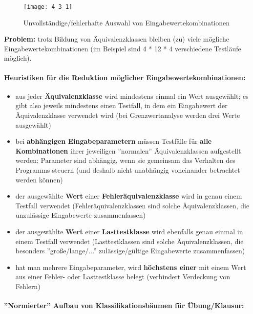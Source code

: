 \begin{figure}[h]
	\centering
	\caption{Unvollständige/fehlerhafte Auswahl von Eingabewertekombinationen}
	\texttt{[image: 4\_3\_1]}
\end{figure}

\textbf{Problem:} trotz Bildung von Äquivalenzklassen bleiben (zu) viele mögliche Eingabewertekombinationen (im Beispiel sind 4 * 12 * 4 verschiedene Testläufe möglich).

\paragraph{Heuristiken für die Reduktion möglicher Eingabewertekombinationen:}

\begin{itemize}
	\item aus jeder \textbf{Äquivalenzklasse} wird mindestens einmal ein Wert ausgewählt; es gibt also jeweils mindestens einen Testfall, in dem ein Eingabewert der Äquivalenzklasse verwendet wird (bei Grenzwertanalyse werden drei Werte ausgewählt)
	\item bei \textbf{abhängigen Eingabeparametern} müssen Testfälle für \textbf{alle Kombinationen} ihrer jeweiligen ''normalen'' Äquivalenzklassen aufgestellt werden; Parameter sind abhängig, wenn sie gemeinsam das Verhalten des Programms steuern (und deshalb nicht unabhängig voneinander betrachtet werden können)
	\item der ausgewählte \textbf{Wert} einer \textbf{Fehleräquivalenzklasse} wird in genau einem Testfall verwendet (Fehleräquivalenzklassen sind solche Äquivalenzklassen, die unzulässige Eingabewerte zusammenfassen)
	\item der ausgewählte \textbf{Wert} einer \textbf{Lasttestklasse} wird ebenfalls genau einmal in einem Testfall verwendet  (Lasttestklassen sind solche Äquivalenzklassen, die besonders ''große/lange/...'' zulässige/gültige Eingabewerte zusammenfassen)
	\item hat man mehrere Eingabeparameter, wird \textbf{höchstens einer} mit einem Wert aus einer Fehler- oder Lasttestklasse belegt (verhindert Verdeckung von Fehlern)
\end{itemize}

\paragraph{''Normierter'' Aufbau von Klassifikationsbäumen für Übung/Klausur:}


